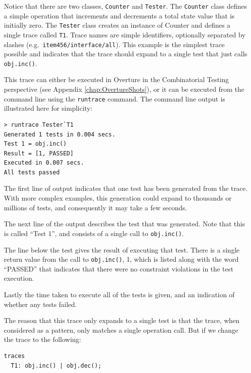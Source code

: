 \documentclass{overturerepchap}
\begin{document}
Notice that there are two classes, \texttt{Counter} and \texttt{Tester}. The \texttt{Counter} class defines a
simple operation that increments and decrements a total state value that is
initially zero. The \texttt{Tester} class creates an instance of Counter and defines a
single trace called \texttt{T1}. Trace names are simple identifiers, optionally separated
by slashes (e.g.\ \texttt{item456/interface/all}). This example is the simplest
trace possible and indicates that the trace should expand to a single test that
just calls \texttt{obj.inc()}.

This trace can either be executed in Overture in the Combinatorial Testing
perspective (see Appendix \ref{chap:OvertureShots}), or it can be executed from
the command line using the \texttt{runtrace} command. The command line output is
illustrated here for simplicity:

\lstset{style=tool,language=}
\begin{lstlisting}[escapechar=@]
> runtrace Tester`T1
Generated 1 tests in 0.004 secs. 
Test 1 = obj.inc()
Result = [1, PASSED]
Executed in 0.007 secs. 
All tests passed
\end{lstlisting}
\lstset{style=mystyle}
\lstset{language=VDM++}

The first line of output indicates that one test has been generated from the
trace. With more complex examples, this generation could expand to thousands or
millions of tests, and consequently it may take a few seconds.

The next line of the output describes the test that was generated. Note that
this is called ``Test 1'', and consists of a single call to \texttt{obj.inc()}.

The line below the test gives the result of executing that test. There is a
single return value from the call to \texttt{obj.inc()}, 1, which is listed
along with the word ``PASSED'' that indicates that there were no constraint violations
in the test execution.

Lastly the time taken to execute all of the tests is given, and an indication of
whether any tests failed.

The reason that this trace only expands to a single test is that the trace, when
considered as a pattern, only matches a single operation call. But if we change
the trace to the following:

\small
\begin{lstlisting}
traces
  T1: obj.inc() | obj.dec();
\end{lstlisting}
\normalsize
\end{document}
